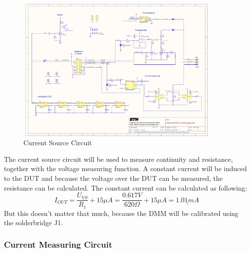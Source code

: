 \begin{figure}[H]
	\centering
	\includegraphics[width=10cm, trim={20cm 23cm 10cm 1cm}, clip]{../../../5_Hardware/PCB_EXTENSION_CircuitVoyager_pre1/Project Outputs for PCB_EXT_CV_PRE1/Schematic_PCB_EXTENSION_CircuitVoyager_pre1.pdf}
	\caption{Current Source Circuit}
	\label{fig:Current Source Circuit}
\end{figure}

The current source circuit will be used to measure continuity and resistance, together with the voltage measuring function. A constant current will be induced to the DUT and because the voltage over the DUT can be measured, the resistance can be calculated. The constant current can be calculated as following:
\[I_{OUT} = \frac{U_{VS}}{R_1} + 15\mu A = \frac{0.617V}{620\Omega} + 15\mu A = \underline{\underline{1.01mA}}\]
But this doesn't matter that much, because the DMM will be calibrated using the solderbridge J1.
\\



\subsubsection{Current Measuring Circuit}

